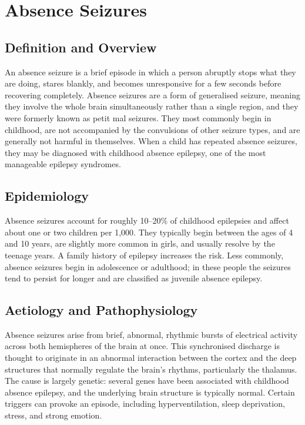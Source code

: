 \chapter{Absence Seizures}

\section*{Definition and Overview}
An absence seizure is a brief episode in which a person abruptly stops what they are doing, stares blankly, and becomes unresponsive for a few seconds before recovering completely. Absence seizures are a form of generalised seizure, meaning they involve the whole brain simultaneously rather than a single region, and they were formerly known as petit mal seizures. They most commonly begin in childhood, are not accompanied by the convulsions of other seizure types, and are generally not harmful in themselves. When a child has repeated absence seizures, they may be diagnosed with childhood absence epilepsy, one of the most manageable epilepsy syndromes.

\section*{Epidemiology}
Absence seizures account for roughly 10--20\% of childhood epilepsies and affect about one or two children per 1,000. They typically begin between the ages of 4 and 10 years, are slightly more common in girls, and usually resolve by the teenage years. A family history of epilepsy increases the risk. Less commonly, absence seizures begin in adolescence or adulthood; in these people the seizures tend to persist for longer and are classified as juvenile absence epilepsy.

\section*{Aetiology and Pathophysiology}
Absence seizures arise from brief, abnormal, rhythmic bursts of electrical activity across both hemispheres of the brain at once. This synchronised discharge is thought to originate in an abnormal interaction between the cortex and the deep structures that normally regulate the brain's rhythms, particularly the thalamus. The cause is largely genetic: several genes have been associated with childhood absence epilepsy, and the underlying brain structure is typically normal. Certain triggers can provoke an episode, including hyperventilation, sleep deprivation, stress, and strong emotion.

